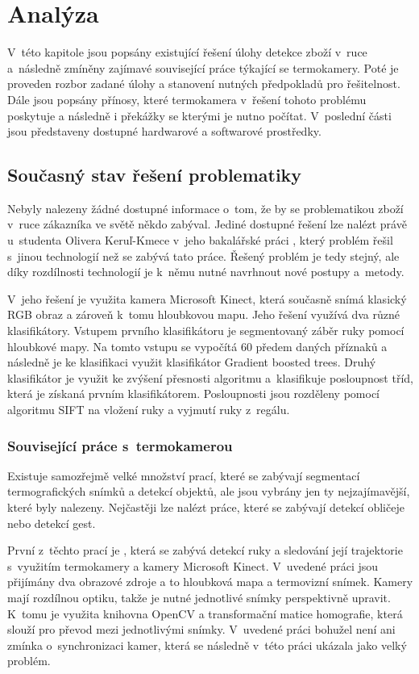 \chapter{Analýza}
V~této kapitole jsou popsány existující řešení úlohy detekce zboží v~ruce a~následně zmíněny zajímavé související práce týkající se termokamery. Poté je proveden rozbor zadané úlohy a stanovení nutných předpokladů pro řešitelnost. Dále jsou popsány přínosy, které termokamera v~řešení tohoto problému poskytuje a následně i překážky se kterými je nutno počítat. V~poslední části jsou představeny dostupné hardwarové a softwarové prostředky.

\section{Současný stav řešení problematiky} 
Nebyly nalezeny žádné dostupné informace o~tom, že by se problematikou zboží v~ruce zákazníka ve světě někdo zabýval. Jediné dostupné řešení lze nalézt právě u~studenta Olivera Keruľ-Kmece v~jeho bakalářské práci \cite{kerul2016detekce}, který problém řešil s~jinou technologií než se zabývá tato práce. Řešený problém je tedy stejný, ale díky rozdílnosti technologií je k~němu nutné navrhnout nové postupy a~metody.

V~jeho řešení je využita kamera Microsoft Kinect, která současně snímá klasický RGB obraz a zároveň k~tomu hloubkovou mapu. Jeho řešení využívá dva různé klasifikátory. Vstupem prvního klasifikátoru je segmentovaný záběr ruky pomocí hloubkové mapy. Na tomto vstupu se vypočítá 60 předem daných příznaků a následně je ke klasifikaci využit klasifikátor Gradient boosted trees. Druhý klasifikátor je využit ke zvýšení přesnosti algoritmu a~klasifikuje posloupnost tříd, která je získaná prvním klasifikátorem. Posloupnosti jsou rozděleny pomocí algoritmu SIFT na vložení ruky a vyjmutí ruky z~regálu.

	\subsection{Související práce s~termokamerou}
    Existuje samozřejmě velké množství prací, které se zabývají segmentací termografických snímků a detekcí objektů, ale jsou vybrány jen ty nejzajímavější, které byly nalezeny. \todo{}Nejčastěji lze nalézt práce, které se zabývají detekcí obličeje nebo detekcí gest.
    
    První z~těchto prací je \cite{saba2012dante}, která se zabývá detekcí ruky a sledování její trajektorie s~využitím termokamery a kamery Microsoft Kinect. V~uvedené práci jsou přijímány dva obrazové zdroje a to hloubková mapa a termovizní snímek. Kamery mají rozdílnou optiku, takže je nutné jednotlivé snímky perspektivně upravit. K~tomu je využita knihovna OpenCV a transformační matice homografie, která slouží pro převod mezi jednotlivými snímky. V~uvedené práci bohužel není ani zmínka o~synchronizaci kamer, která se následně v~této práci ukázala jako velký problém.
    
